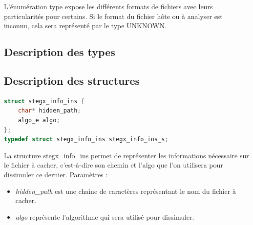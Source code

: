 \documentclass[11pt]{article}
\begin{document}
L'énumération type expose les différents formats de fichiers avec leurs 
particularités pour certains. Si le format du fichier hôte ou à analyser 
est inconnu, cela sera représenté par le type UNKNOWN. 

\subsection{Description des types}

\subsection{Description des structures}



\begin{lstlisting}[language=c]
struct stegx_info_ins {
    char* hidden_path;
    algo_e algo;
};
typedef struct stegx_info_ins stegx_info_ins_s;
\end{lstlisting}

La structure stegx\_info\_ins permet de représenter les informations 
nécessaire sur le fichier à cacher, c'est-à-dire son chemin et l'algo que 
l'on utilisera pour dissimuler ce dernier. \newline
\underline{Paramètres :}
\begin{itemize}
\item \textit{hidden\_path} est une chaine de caractères représentant le nom du fichier 
à cacher. 
\item \textit{algo} représente l'algorithme qui sera utilisé pour dissimuler. 
\newline
\end{itemize}
\end{document}
